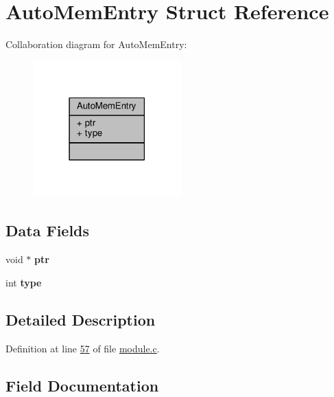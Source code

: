 \hypertarget{structAutoMemEntry}{}\section{Auto\+Mem\+Entry Struct Reference}
\label{structAutoMemEntry}


Collaboration diagram for Auto\+Mem\+Entry\+:\nopagebreak
\begin{figure}[H]
\begin{center}
\leavevmode
\includegraphics[width=162pt]{structAutoMemEntry__coll__graph}
\end{center}
\end{figure}
\subsection*{Data Fields}
\begin{DoxyCompactItemize}
\item 
\mbox{\label{structAutoMemEntry_a900b3ee5c783609e0890be09827e099f}} 
void $\ast$ {\bfseries ptr}
\item 
\mbox{\label{structAutoMemEntry_a9df5deaf0ef1229c76c3b63833d71544}} 
int {\bfseries type}
\end{DoxyCompactItemize}


\subsection{Detailed Description}


Definition at line \hyperlink{module_8c_source_l00057}{57} of file \hyperlink{module_8c_source}{module.\+c}.



\subsection{Field Documentation}
\mbox{\label{structAutoMemEntry_a900b3ee5c783609e0890be09827e099f}} 
